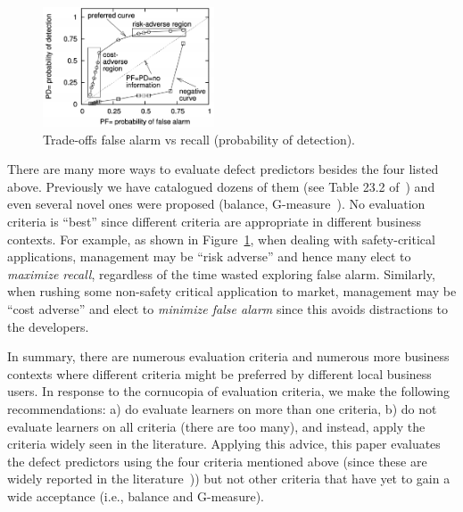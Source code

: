 \documentclass[sigconf]{acmart}
\theoremstyle{break}
\begin{document}
 \begin{figure}
\begin{center}
\includegraphics[width=2.0in]{roc.png}
\end{center}
\vspace{-0.2cm}
\caption{Trade-offs false alarm vs
recall (probability of detection).  }\label{fig:trade}
 \end{figure}
There are many more ways to evaluate defect predictors besides the four listed above.
Previously we have catalogued dozens of them (see Table 23.2 of~\cite{menzies2014sharing}) and even several novel ones were proposed
(balance, G-measure~\cite{menzies2007data}).  
No evaluation criteria is ``best'' since different  criteria are appropriate in different business contexts. For example, as shown
in 
Figure~\ref{fig:trade},
when dealing
with safety-critical applications, management may be
``risk adverse'' and hence many elect
 to {\em maximize recall}, regardless of the time wasted exploring  false alarm.
 Similarly, 
when rushing some non-safety critical application to market, management may be ``cost adverse''
and elect to {\em minimize false alarm} since this avoids distractions to the developers. 

In summary, there are  numerous evaluation criteria and  numerous more business contexts
where different criteria might be preferred by different local business users. In response to
the cornucopia of evaluation criteria, we make the following recommendations: a) do evaluate learners on more than one criteria, b) do not evaluate learners on  all criteria (there are too many), and instead, apply the criteria widely seen in the literature. Applying this advice, this paper  evaluates the defect predictors using the four criteria
mentioned above (since these are widely reported in the literature~\cite{ghotra2015revisiting,fu2016tuning})) but not other 
 criteria  that  have yet to gain a wide acceptance 
 (i.e., balance and G-measure).
 
\end{document}
